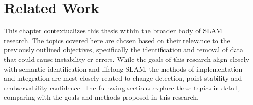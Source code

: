 \section{Related Work}
\label{sec:related_work}

This chapter contextualizes this thesis within the broader body of SLAM research. The topics covered here are chosen based on their relevance to the previously outlined objectives, specifically the identification and removal of data that could cause instability or errors. While the goals of this research align closely with semantic identification and lifelong SLAM, the methods of implementation and integration are most closely related to change detection, point stability and reobservability confidence. The following sections explore these topics in detail, comparing with the goals and methods proposed in this research.

% 